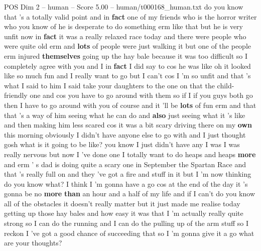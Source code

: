 \begin{textsample}{POS Dim 2 – human – Score 5.00 – human/t000168\_human.txt}  \label{ex:f2_pos_038}
do you know that 's a totally valid point and in \textbf{fact} one of my friends who is the horror writer who you know of he is desperate to do something erm like that but he is very unfit now in \textbf{fact} it was a really relaxed race today and there were people who were quite old erm and \textbf{lots} of people were just walking it but one of the people erm injured \textbf{themselves} going up the hay bale because it was too difficult so I completely agree with you and I in \textbf{fact} I did say to cos he was like oh it looked like so much fun and I really want to go but I can't cos I 'm so unfit and that 's what I said to him I said take your daughters to the one on that the child-friendly one and cos you have to go around with them so if I if you guys both go then I have to go around with you of course and it 'll be \textbf{lots} of fun erm and that that 's a way of him seeing what he can do and \textbf{also} just seeing what it 's like and then making him less scared cos it was a bit scary driving there on my \textbf{own} this morning obviously I didn't have anyone else to go with and I just thought gosh what is it going to be like? you know I just didn't have any I was I was really nervous but now I 've done one I totally want to do heaps and heaps \textbf{more} and erm ' s dad is doing quite a scary one in September the Spartan Race and that 's really full on and they 've got a fire and stuff in it but I 'm now thinking do you know what?
I think I 'm gonna have a go cos at the end of the day it 's gonna be no \textbf{more} \textbf{than} an hour and a half of my life and if I can't do you know all of the obstacles it doesn't really matter but it just made me realise today getting up those hay bales and how easy it was that I 'm actually really quite strong so I can do the running and I can do the pulling up of the arm stuff so I reckon I 've got a good chance of succeeding that so I 'm gonna give it a go what are your thoughts?

\end{textsample}
